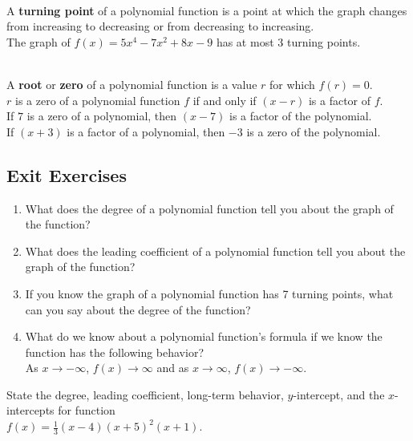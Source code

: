 \begin{myDefinition}~\\[0.5mm]
A {\bf turning point} of a polynomial function is a point at which the graph changes from increasing to decreasing or from decreasing to increasing.\\[0.5em]
 The graph of  $f(x) = 5x^4-7x^2+8x-9$ has at most 3 turning points.
\end{myDefinition}


\begin{myDefinition}~\\[0.5mm]
A {\bf root} or {\bf zero} of a polynomial function is a value $r$ for which $f(r)=0$.\\
$r$ is a zero of a polynomial function $f$ if and only if $(x-r)$ is a factor of $f$.\\[0.5em]
 If $7$ is a zero of a polynomial, then $(x-7)$ is a factor of the polynomial.\\
  If $(x+3)$ is a factor of a polynomial, then $-3$ is a zero of the polynomial.
\end{myDefinition}




 \newpage

\subsection*{Exit Exercises} \label{exit-functions-polynomial-long-term}

\begin{myExit}
	\begin{enumerate}
		\item What does the degree of a polynomial function tell you about the graph of the function?
		\vfill
		\item What does the leading coefficient of a polynomial function tell you about the graph of the function?
		\vfill
		\item If you know the graph of a polynomial function has 7 turning points, what can you say about the degree of the function?
		\vfill
		\item What do we know about a polynomial function's formula if we know the function has the following behavior?\\
		As $x\rightarrow -\infty$, $f(x)\rightarrow \infty$ and as $x\rightarrow \infty$, $f(x)\rightarrow -\infty$.
		\vfill
	\end{enumerate}
\end{myExit}


\begin{myExit}
State the degree, leading coefficient, long-term behavior, $y$-intercept, and the $x$-intercepts for function \\$f(x) = \frac{1}{3}(x-4)(x+5)^2(x+1)$.
		\vfill
\end{myExit}
\vfill









